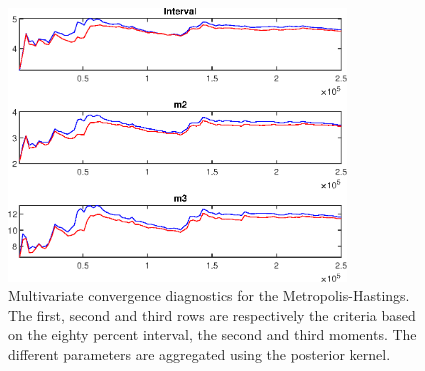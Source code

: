  
\begin{figure}[H]
\centering 
\includegraphics[width=0.8\textwidth]{BRS_comovement/Output/BRS_comovement_mdiag}
\caption{Multivariate convergence diagnostics for the Metropolis-Hastings.
The first, second and third rows are respectively the criteria based on
the eighty percent interval, the second and third moments. The different 
parameters are aggregated using the posterior kernel.}\label{Fig:MultivariateDiagnostics}
\end{figure}

